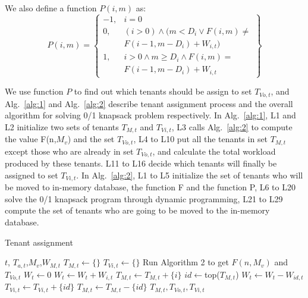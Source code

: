 We also define a function $P(i,m)$ as:
 \begin{equation}
 P(i,m)=\left\{
 \begin{array}{lr}
 -1,&i=0\\
 0,&(i>0) \land (m<D_i \lor F(i,m)\ne \\
 &F(i-1,m-D_i)+W_{i,t})\\
 1,&i>0 \land m \ge D_i \land F(i,m)=\\
  &F(i-1,m-D_i)+W_{i,t}
 \end{array}\right\}
 \end{equation}

We use function $P$ to find out which tenants should be assign to set $T_{Vo,t}$, and Alg.~\ref{alg:1} and Alg.~\ref{alg:2} describe tenant assignment process and the overall algorithm for solving 0/1 knapsack problem respectively. In Alg.~\ref{alg:1}, L1 and L2 initialize two sets of tenants $T_{M,t}$ and $T_{Vi,t}$, L3 calls Alg.~\ref{alg:2} to compute the value F(n,$M_v$) and the set $T_{Vo,t}$, L4 to L10 put all the tenants in set $T_{M,t}$ except those who are already in set $T_{Vo,t}$, and calculate the total workload produced by these tenants. L11 to L16 decide which tenants will finally be assigned to set $T_{Vi,t}$. In Alg.~\ref{alg:2}, L1 to L5 initialize the set of tenants who will be moved to in-memory database, the function F and the function P, L6 to L20 solve the 0/1 knapsack program through dynamic programming, L21 to L29 compute the set of tenants who are going to be moved to the in-memory database.

\begin{algorithm}[!htb]
\caption{Tenant assignment}
\label{alg:1}
    \begin{algorithmic}[1]
    \Require $t$, $T_{a, t}$,$M_v$,$W_{M,t}$
     \State $T_{M, t} \gets \{\}$
      \State $T_{Vi, t} \gets \{\}$
      \State Run Algorithm 2 to get $F(n,M_v)$ and $T_{Vo,t}$
      \State $W_t\gets 0$
      \State $W_t\gets W_t+W_{i,t}$
      \State $T_{M,t}\gets T_{M,t}+\{i\}$
      \EndIf
      \EndFor
      \State $id\gets $top($T_{M,t}$)
      \State $W_t\gets W_t-W_{id,t}$
      \State $T_{Vi,t}\gets T_{Vi,t}+\{id\}$
      \State $T_{M,t}\gets T_{M,t}-\{id\}$
      \EndWhile
      \Ensure $T_{M,t},T_{Vo,t},T_{Vi,t}$
    \end{algorithmic}
\end{algorithm}

